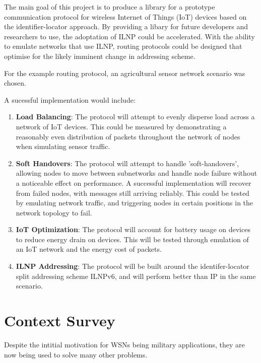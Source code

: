 \documentclass[12pt]{article}
\begin{document}
The main goal of this project is to produce a library for a prototype communication
protocol for wireless Internet of Things (IoT) devices based on the identifier-locator approach. By providing a libary for future developers and researchers to use, the adoptation of ILNP could be accelerated. With the ability to emulate networks that use ILNP, routing protocols could be designed that optimise for the likely imminent change in addressing scheme. 

For the example routing protocol, an agricultural sensor network scenario was chosen. 

\vspace{\baselineskip}
\noindent A sucessful implementation would include:

\begin{enumerate}
	\item \textbf{Load Balancing}: The protocol will attempt to evenly disperse load across a network of IoT
devices. This could be measured by demonstrating a reasonably even distribution of packets throughout the network of nodes when simulating sensor traffic. 
	\item \textbf{Soft Handovers}: The protocol will attempt to handle ’soft-handovers’, allowing nodes to
move between subnetworks and handle node failure without a noticeable effect on performance. A successful implementation will recover from failed nodes, with messages still arriving reliably. This could be tested by emulating network traffic, and triggering nodes in certain positions in the network topology to fail.

	\item \textbf{IoT Optimization}: The protocol will account for battery usage on devices to reduce energy drain
	on devices. This will be tested through emulation of an IoT network and the energy cost of packets.
	\item \textbf{ILNP Addressing}: The protocol will be built around the identifer-locator split addressing scheme ILNPv6, and will perform better than IP in the same scenario.
\end{enumerate}

\pagebreak
\section{Context Survey}

Despite the intitial motivation for WSNs being military applications, they are now being used to solve many other problems.
\end{document}
